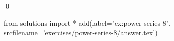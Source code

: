 \begin{ex}
  \label{ex:power-series-8}
  
  \qed
\end{ex}
\begin{python0}
from solutions import *
add(label="ex:power-series-8",
    srcfilename='exercises/power-series-8/answer.tex') 
\end{python0}                              
